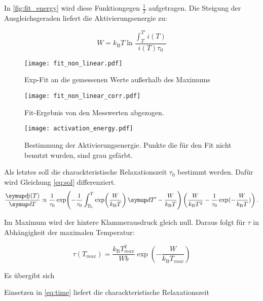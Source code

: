 In \autoref{fig:fit_energy} wird diese Funktiongegen $\frac{1}{T}$ aufgetragen. Die Steigung der Ausgleichsgeraden liefert die Aktivierungsenergie zu:
\begin{equation}
  
\end{equation}

\begin{equation}
  W = k_\mathrm{B} T \ln \frac{\int_T^{T'} i(T)}{ i(T) \tau_0}
  \label{eq:final}
\end{equation}

\begin{figure}
  \centering
  \texttt{[image: fit\_non\_linear.pdf]}
  \caption{Exp-Fit an die gemessenen Werte außerhalb des Maximums}
  \label{fig:fit_non_linear}
\end{figure}

\begin{figure}
  \centering
  \texttt{[image: fit\_non\_linear\_corr.pdf]}
  \caption{Fit-Ergebnis von den Messwerten abgezogen.}
  \label{fig:fit_non_linear_corr}
\end{figure}


\begin{figure}
  \centering
  \texttt{[image: activation\_energy.pdf]}
  \caption{Bestimmung der Aktivierungsenergie. Punkte die für den Fit nicht benutzt wurden, sind grau gefärbt.}
  \label{fig:fit_energy}
\end{figure}


Als letztes soll die charackteristische Relaxationszeit $\tau_0$ bestimmt werden. Dafür wird Gleichung \eqref{eq:sol} differenziert.
\begin{equation}
  \label{eq:crazy}
  \dd{j(T)}{T} \propto
    \frac{1}{\tau_0}
    \exp\!\left(
      -\frac{1}{\tau_0} \int_{T_0}^{T} \exp\! \left( \frac{W}{k_\mathrm{B} T} \right)  \dif{T'} - \frac{W}{k_\mathrm{B} T}
    \right) \left( \frac{W}{k_\mathrm{B} T^2} -   \frac{1}{\tau_0}\exp(-\frac{W}{k_\mathrm{B} T}) \right).
\end{equation}

Im Maximum wird der hintere Klammerausdruck gleich null. Daraus folgt für $\tau$ in Abhängigkeit der maximalen Temperatur:

\begin{equation}
  \label{eq:tau}
  \tau(T_{max}) = \frac{k_\mathrm{B} T_{max}^2}{W b} \exp\left(-\frac{W}{k_\mathrm{B} T_{max}} \right)
\end{equation}

Es übergibt sich
\begin{equation}
  
\end{equation}

Einsetzen in \eqref{eq:time} liefert die  charackteristische Relaxationszeit
\begin{equation}
  
\end{equation}
